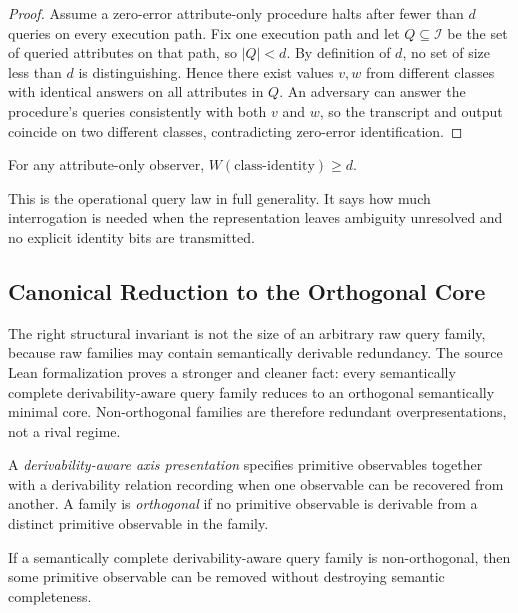 \begin{proof}
Assume a zero-error attribute-only procedure halts after fewer than $d$ queries on every execution path. Fix one execution path and let $Q \subseteq \mathcal I$ be the set of queried attributes on that path, so $|Q|<d$. By definition of $d$, no set of size less than $d$ is distinguishing. Hence there exist values $v,w$ from different classes with identical answers on all attributes in $Q$. An adversary can answer the procedure's queries consistently with both $v$ and $w$, so the transcript and output coincide on two different classes, contradicting zero-error identification.
\end{proof}

\begin{corollary}\label{cor:attribute-only-witness-lb}
For any attribute-only observer, $W(\text{class-identity}) \ge d$.
\end{corollary}

This is the operational query law in full generality. It says how much interrogation is needed when the representation leaves ambiguity unresolved and no explicit identity bits are transmitted.

\subsection{Canonical Reduction to the Orthogonal Core}

The right structural invariant is not the size of an arbitrary raw query family, because raw families may contain semantically derivable redundancy. The source Lean formalization proves a stronger and cleaner fact: every semantically complete derivability-aware query family reduces to an orthogonal semantically minimal core. Non-orthogonal families are therefore redundant overpresentations, not a rival regime.

\begin{definition}
A \emph{derivability-aware axis presentation} specifies primitive observables together with a derivability relation recording when one observable can be recovered from another. A family is \emph{orthogonal} if no primitive observable is derivable from a distinct primitive observable in the family.
\end{definition}

\begin{proposition}\label{prop:query-redundancy}
If a semantically complete derivability-aware query family is non-orthogonal, then some primitive observable can be removed without destroying semantic completeness.
\end{proposition}

